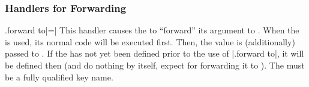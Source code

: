 \subsubsection{Handlers for Forwarding}

\begin{handler}{{.forward to}|=|}
    This handler causes the  to ``forward'' its argument to
    . When the  is used, its normal code will be
    executed first. Then, the value is (additionally) passed to . If the  has not yet been defined prior to the use of
    |.forward to|, it will be defined then (and do nothing by itself, expect
    for forwarding it to ). The  must be a
    fully qualified key name.
\begin{codeexample}[]
 
\end{codeexample}
\end{handler}

